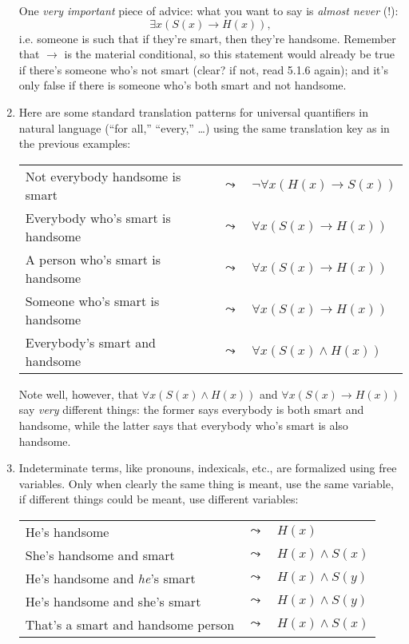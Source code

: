 \begin{enumerate}[\thesection.1]
		One \emph{very important} piece of advice: what you want to say is \emph{almost never} (!): \[\exists x(S(x)\to H(x)),\] i.e. someone is such that if they're smart, then they're handsome. Remember that $\to$ is the material conditional, so this statement would already be true if there's someone who's not smart (clear? if not, read 5.1.6 again); and it's only false if there is someone who's both smart and not handsome.
		
		
		\item Here are some standard translation patterns for universal quantifiers in natural language (``for all,'' ``every,'' \dots) using the same translation key as in the previous examples:		
		\begin{longtable}{p{6cm} c l}
		
		Not everybody handsome is smart & $\leadsto$ & $\neg\forall x(H(x)\to S(x))$\\
Everybody who's smart is handsome & $\leadsto$ &$\forall x(S(x)\to H(x))$\\
A person who's smart is handsome & $\leadsto$ &$\forall x(S(x)\to H(x))$\\
Someone who's smart is handsome & $\leadsto$ &$\forall x(S(x)\to H(x))$\\
Everybody's smart and handsome & $\leadsto$ &$\forall x(S(x)\land H(x))$
		\end{longtable}
		Note well, however, that $\forall x(S(x)\land H(x))$ and $\forall x(S(x)\to H(x))$ say \emph{very} different things: the former says everybody is both smart and handsome, while the latter says that everybody who's smart is also handsome.
		
		\item Indeterminate terms, like pronouns, indexicals, etc., are formalized using free variables. Only when clearly the same thing is meant, use the same variable, if different things could be meant, use different variables:
		
		\begin{longtable}{p{7cm} c l}
		He's handsome & $\leadsto$ & $H(x)$\\
		She's handsome and smart & $\leadsto$ & $H(x)\land S(x)$\\
		He's handsome and \emph{he}'s smart & $\leadsto$ & $H(x)\land S(y)$\\
		He's handsome and she's smart & $\leadsto$ & $H(x)\land S(y)$\\
		That's a smart and handsome person & $\leadsto$ & $H(x)\land S(x)$\\
		

\end{longtable}
\end{enumerate}
